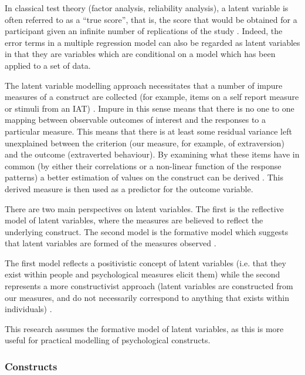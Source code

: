 In classical test theory (factor analysis, reliability analysis), a latent variable is often referred to as a ``true score'', that is, the score that would be obtained for a participant given an infinite number of replications of the study \cite{bollen2002latent,edwards2000nature}. Indeed, the error terms in a multiple regression model can also be regarded as latent variables \cite{bollen2002latent} in that they are variables which are conditional on a model which has been applied to a set of data. 

 The latent variable modelling approach necessitates that a number of impure measures of a construct are collected (for example, items on a self report measure or stimuli from an IAT) \cite{edwards2000nature}. Impure in this sense means that there is no one to one mapping between observable outcomes of interest and the responses to a particular measure. This means that there is at least some residual variance left unexplained between the criterion (our measure, for example, of extraversion) and the outcome (extraverted behaviour).  By examining what these items have in common (by either their correlations or a non-linear function of the response patterns) a better estimation of values on the  construct can be derived \cite{borsboom2006attack}. This derived measure is then used as a predictor for the outcome variable. 

There are two main perspectives on latent variables. The first is the reflective model of latent variables, where the measures are believed to reflect the underlying construct. The second model is the formative model which suggests that latent variables are formed of the measures observed \cite{bollen2002latent,edwards2000nature}.

The first model reflects a positivistic concept of latent variables (i.e. that they exist within people and psychological measures elicit them) while the second represents a more constructivist approach (latent variables are constructed from our measures, and do not necessarily correspond to anything that exists within individuals) \cite{borsboom2005measuring}.

This research assumes the formative model of latent variables, as this is more useful for practical modelling of psychological constructs. 

\subsubsection{Constructs}
\label{sec:constructs}

